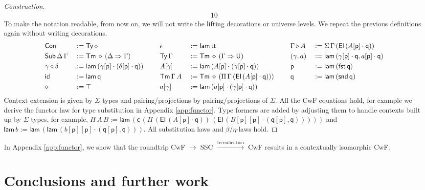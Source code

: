 \documentclass[submission,copyright,creativecommons]{eptcs}
\newcommand{\Ra}{\Rightarrow}
\newcommand{\Ty}{\mathsf{Ty}}
\newcommand{\Tm}{\mathsf{Tm}}
\newcommand{\Con}{\mathsf{Con}}
\newcommand{\Sub}{\mathsf{Sub}}
\newcommand{\p}{\mathsf{p}}
\newcommand{\q}{\mathsf{q}}
\newcommand{\ext}{\mathop{\triangleright}}
\newcommand{\lam}{\mathsf{lam}}
\newcommand{\U}{\mathsf{U}}
\newcommand{\El}{\mathsf{El}}
\newcommand{\cd}{\mathsf{c}}
\renewcommand{\tt}{\mathsf{tt}}
\newcommand{\fst}{\mathsf{fst}}
\newcommand{\snd}{\mathsf{snd}}
\newcommand{\id}{\mathsf{id}}
\begin{document}
\begin{proof}[Construction]
\begin{alignat*}{10}
  \end{alignat*}
  To make the notation readable, from now on, we will not write the
  lifting decorations or universe levels. We repeat the previous
  definitions again without writing decorations.
  \begin{alignat*}{10}
    & \Con && := \Ty\,\diamond                                                          && \epsilon && := \lam\,\tt                                                                      && \Gamma\ext A && := \Sigma\,\Gamma\,(\El\,(A[\p]\cdot\q)) \\
    & \Sub\,\Delta\,\Gamma && := \Tm\,\diamond\,(\Delta\Ra\Gamma)                       && \Ty\,\Gamma && := \Tm\,\diamond\,(\Gamma\Ra\U)                                                && (\gamma,a) && := \lam\,(\gamma[\p]\cdot\q,a[\p]\cdot\q) \\
    & \gamma\circ\delta && := \lam\,(\gamma[\p]\cdot(\delta[\p]\cdot\q)) \hspace{1.4em} && A[\gamma] && := \lam\,(A[\p]\cdot(\gamma[\p]\cdot\q))                                         && \p && := \lam\,(\fst\,\q) \\
    & \id && := \lam\,\q                                                                && \Tm\,\Gamma\,A && := \Tm\,\diamond\,(\Pi\,\Gamma\,(\El\,(A[\p]\cdot\q))) \hspace{1.4em}       && \q && := \lam\,(\snd\,\q) \\
    & \diamond && := \top                                                               && a[\gamma] && := \lam\,(a[\p]\cdot(\gamma[\p]\cdot\q))
  \end{alignat*}
  Context extension is given by $\Sigma$ types and pairing/projections
  by pairing/projections of $\Sigma$. All the CwF equations hold, for
  example we derive the functor law for type substitution in Appendix
  \ref{app:functor}. Type formers are added by adjusting them to handle contexts built up
  by $\Sigma$ types, for example,
  $
  \Pi\,A\,B := \lam\,(\cd\,(\Pi\,(\El\,(A[\p]\cdot\q))\,(\El\,(B[\p][\p]\cdot(\q[\p],\q)))))
  $
  and $\lam\,b := \lam\,(\lam\,(b[\p][\p]\cdot(\q[\p],\q)))$. All
  substitution laws and $\beta$/$\eta$-laws hold.
\end{proof}
In Appendix \ref{app:functor}, we show that the roundtrip CwF
$\longrightarrow$ SSC
$\xrightarrow{\text{termification}}$ CwF results in a
contextually isomorphic CwF.

\section{Conclusions and further work}
\label{sec:conclusion}
\end{document}
